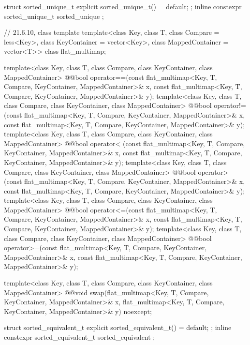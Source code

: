 \begin{codeblock}
{  struct sorted_unique_t { explicit sorted_unique_t() = default; };
  inline constexpr sorted_unique_t sorted_unique {};

  // 21.6.10, class template 
  template<class Key, class T, class Compare = less<Key>,
           class KeyContainer = vector<Key>, class MappedContainer = vector<T>>
    class flat_multimap;

  template<class Key, class T, class Compare,
           class KeyContainer, class MappedContainer>
    @@bool
    operator==(const flat_multimap<Key, T, Compare, KeyContainer, MappedContainer>& x,
               const flat_multimap<Key, T, Compare, KeyContainer, MappedContainer>& y);
  template<class Key, class T, class Compare,
           class KeyContainer, class MappedContainer>
    @@bool
    operator!=(const flat_multimap<Key, T, Compare, KeyContainer, MappedContainer>& x,
               const flat_multimap<Key, T, Compare, KeyContainer, MappedContainer>& y);
  template<class Key, class T, class Compare,
           class KeyContainer, class MappedContainer>
    @@bool
    operator< (const flat_multimap<Key, T, Compare, KeyContainer, MappedContainer>& x,
               const flat_multimap<Key, T, Compare, KeyContainer, MappedContainer>& y);
  template<class Key, class T, class Compare,
           class KeyContainer, class MappedContainer>
    @@bool
    operator> (const flat_multimap<Key, T, Compare, KeyContainer, MappedContainer>& x,
               const flat_multimap<Key, T, Compare, KeyContainer, MappedContainer>& y);
  template<class Key, class T, class Compare,
           class KeyContainer, class MappedContainer>
    @@bool
    operator<=(const flat_multimap<Key, T, Compare, KeyContainer, MappedContainer>& x,
               const flat_multimap<Key, T, Compare, KeyContainer, MappedContainer>& y);
  template<class Key, class T, class Compare,
           class KeyContainer, class MappedContainer>
    @@bool
    operator>=(const flat_multimap<Key, T, Compare, KeyContainer, MappedContainer>& x,
               const flat_multimap<Key, T, Compare, KeyContainer, MappedContainer>& y);

  template<class Key, class T, class Compare,
           class KeyContainer, class MappedContainer>
    @@void
    swap(flat_multimap<Key, T, Compare, KeyContainer, MappedContainer>& x,
         flat_multimap<Key, T, Compare, KeyContainer, MappedContainer>& y) noexcept;

  struct sorted_equivalent_t { explicit sorted_equivalent_t() = default; };
  inline constexpr sorted_equivalent_t sorted_equivalent {};
}
\end{codeblock}

